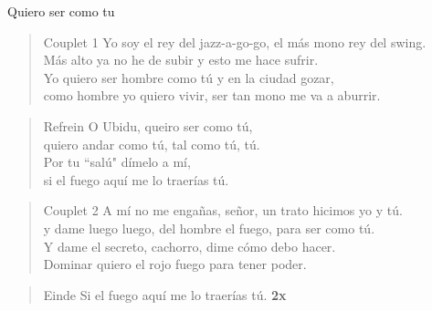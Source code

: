 \begin{song}{Quiero ser como tu}


\begin{verse}{Couplet 1}
Yo soy el rey del jazz-a-go-go, el m\'as mono rey del swing.\\
M\'as alto ya no he de subir y esto me hace sufrir.\\
Yo quiero ser hombre como t\'u y en la ciudad gozar,\\
como hombre yo quiero vivir, ser tan mono me va a aburrir. \hspace{3em} \hspace{1em}
\end{verse}

\begin{verse}{Refrein}
O Ubidu, queiro ser como t\'u,\\
quiero andar como t\'u, tal como t\'u, t\'u.\\
Por tu ``sal\'u" d\'imelo a m\'i,\\
si el fuego aqu\'i me lo traer\'ias t\'u.\\
\end{verse}

\begin{verse}{Couplet 2}
A m\'i no me enga\~nas, se\~nor, un trato hicimos yo y t\'u.\\
y dame luego luego, del hombre el fuego, para ser como t\'u.\\
Y dame el secreto, cachorro, dime c\'omo debo hacer.\\
Dominar quiero el rojo fuego para tener poder. \hspace{3em} \hspace{1em}
\end{verse}


\begin{verse}{Einde}
Si el fuego aqu\'i me lo traer\'ias t\'u. \textbf{2x}
\end{verse}
\end{song}
